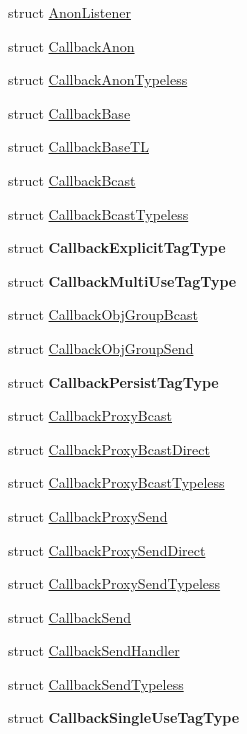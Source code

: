 \begin{DoxyCompactItemize}
\item 
struct \hyperlink{structvt_1_1pipe_1_1callback_1_1_anon_listener}{Anon\+Listener}
\item 
struct \hyperlink{structvt_1_1pipe_1_1callback_1_1_callback_anon}{Callback\+Anon}
\item 
struct \hyperlink{structvt_1_1pipe_1_1callback_1_1_callback_anon_typeless}{Callback\+Anon\+Typeless}
\item 
struct \hyperlink{structvt_1_1pipe_1_1callback_1_1_callback_base}{Callback\+Base}
\item 
struct \hyperlink{structvt_1_1pipe_1_1callback_1_1_callback_base_t_l}{Callback\+Base\+TL}
\item 
struct \hyperlink{structvt_1_1pipe_1_1callback_1_1_callback_bcast}{Callback\+Bcast}
\item 
struct \hyperlink{structvt_1_1pipe_1_1callback_1_1_callback_bcast_typeless}{Callback\+Bcast\+Typeless}
\item 
struct {\bfseries Callback\+Explicit\+Tag\+Type}
\item 
struct {\bfseries Callback\+Multi\+Use\+Tag\+Type}
\item 
struct \hyperlink{structvt_1_1pipe_1_1callback_1_1_callback_obj_group_bcast}{Callback\+Obj\+Group\+Bcast}
\item 
struct \hyperlink{structvt_1_1pipe_1_1callback_1_1_callback_obj_group_send}{Callback\+Obj\+Group\+Send}
\item 
struct {\bfseries Callback\+Persist\+Tag\+Type}
\item 
struct \hyperlink{structvt_1_1pipe_1_1callback_1_1_callback_proxy_bcast}{Callback\+Proxy\+Bcast}
\item 
struct \hyperlink{structvt_1_1pipe_1_1callback_1_1_callback_proxy_bcast_direct}{Callback\+Proxy\+Bcast\+Direct}
\item 
struct \hyperlink{structvt_1_1pipe_1_1callback_1_1_callback_proxy_bcast_typeless}{Callback\+Proxy\+Bcast\+Typeless}
\item 
struct \hyperlink{structvt_1_1pipe_1_1callback_1_1_callback_proxy_send}{Callback\+Proxy\+Send}
\item 
struct \hyperlink{structvt_1_1pipe_1_1callback_1_1_callback_proxy_send_direct}{Callback\+Proxy\+Send\+Direct}
\item 
struct \hyperlink{structvt_1_1pipe_1_1callback_1_1_callback_proxy_send_typeless}{Callback\+Proxy\+Send\+Typeless}
\item 
struct \hyperlink{structvt_1_1pipe_1_1callback_1_1_callback_send}{Callback\+Send}
\item 
struct \hyperlink{structvt_1_1pipe_1_1callback_1_1_callback_send_handler}{Callback\+Send\+Handler}
\item 
struct \hyperlink{structvt_1_1pipe_1_1callback_1_1_callback_send_typeless}{Callback\+Send\+Typeless}
\item 
struct {\bfseries Callback\+Single\+Use\+Tag\+Type}
\end{DoxyCompactItemize}
